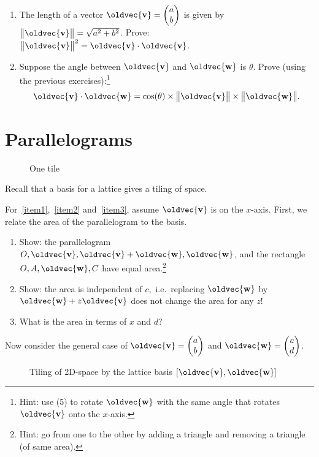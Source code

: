 \documentclass[10pt,a4paper]{article}
\newcommand{\twovec}[2]{\ensuremath{\begin{pmatrix}{#1}\\{#2}\end{pmatrix}}}
\renewcommand{\vec}[1]{\oldvec{\mathbf{#1}}}
\DeclarePairedDelimiter{\norm}{\big\lVert}{\big\rVert}
\begin{document}
\begin{enumerate}
\item The length of a vector \(\vec{v} = \twovec{a}{b}\) is given by \(\norm{\vec{v}} = \sqrt{a^2 + b^2}\).
	Prove: \(\norm{\vec{v}}^2 = \vec{v} \cdot \vec{v}\).

\item Suppose the angle between \(\vec{v}\) and \(\vec{w}\) is \(\theta\).
	Prove (using the previous exercises):\footnote{Hint: use (5) to rotate \(\vec{w}\) with the same angle that rotates \(\vec{v}\) onto the \(x\)-axis.}
	\[\vec{v} \cdot \vec{w} = \cos(\theta) \times \norm{\vec{v}} \times \norm{\vec{w}}.\]
\end{enumerate}

\clearpage
\section{Parallelograms}
\begin{wrapfigure}[5]{r}[1em]{.3\textwidth}
		\vspace*{-3em}
		\caption{One tile}
\end{wrapfigure}

Recall that a basis for a lattice gives a tiling of space.

For~\ref{item1},~\ref{item2} and~\ref{item3}, assume \(\vec{v}\) is on the \(x\)-axis.
First, we relate the area of the parallelogram to the basis.
\begin{enumerate}
	\item\label{item1} Show: the parallelogram \(O, \vec{v}, \vec{v}+\vec{w}, \vec{w}\), and the rectangle \(O, A, \vec{w}, C\) have equal
		area.\footnote{Hint: go from one to the other by adding a triangle and removing a triangle (of same area).}
	\item\label{item2} Show: the area is independent of \(c\),~i.e.~replacing \(\vec{w}\) by \(\vec{w} + z \vec{v}\) does not change the area for any \(z\)!
	\item\label{item3} What is the area in terms of \(x\) and \(d\)?
\end{enumerate}

\noindent
Now consider the general case of \(\vec{v} = \twovec{a}{b}\) and \(\vec{w} = \twovec{c}{d}\).
\begin{figure}[h!]
	\centering{}
	\caption{Tiling of 2D-space by the lattice basis \([\vec{v}, \vec{w}]\)}\label{fig:tiling}
\end{figure}
\end{document}
